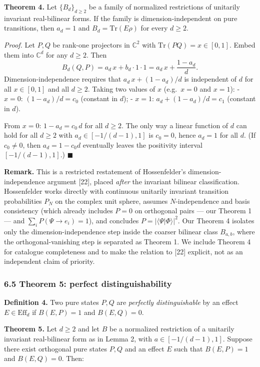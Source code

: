 \documentclass[
]{article}
\begin{document}
\textbf{Theorem 4.} Let \(\{B_d\}_{d\geq 2}\) be a family of normalized
restrictions of unitarily invariant real-bilinear forms. If the family
is dimension-independent on pure transitions, then \(a_d=1\) and
\(B_d=\mathrm{Tr}(E\rho)\) for every \(d\geq 2\).

\emph{Proof.} Let \(P,Q\) be rank-one projectors in \(\mathbb C^2\) with
\(\mathrm{Tr}(PQ)=x\in[0,1]\). Embed them into \(\mathbb C^d\) for any
\(d\geq 2\). Then
\[B_d(Q,P)=a_d\,x+b_d\cdot 1\cdot 1=a_d\,x+\frac{1-a_d}{d}.\]
Dimension-independence requires that \(a_d\,x+(1-a_d)/d\) is independent
of \(d\) for all \(x\in[0,1]\) and all \(d\geq 2\). Taking two values of
\(x\) (e.g.~\(x=0\) and \(x=1\)): - \(x=0\): \((1-a_d)/d = c_0\)
(constant in \(d\)); - \(x=1\): \(a_d+(1-a_d)/d = c_1\) (constant in
\(d\)).

From \(x=0\): \(1-a_d=c_0\,d\) for all \(d\geq 2\). The only way a
linear function of \(d\) can hold for all \(d\geq 2\) with
\(a_d\in[-1/(d-1),1]\) is \(c_0=0\), hence \(a_d=1\) for all \(d\). (If
\(c_0\neq 0\), then \(a_d=1-c_0 d\) eventually leaves the positivity
interval \([-1/(d-1),1]\).) \(\blacksquare\)

\textbf{Remark.} This is a restricted restatement of Hossenfelder's
dimension-independence argument {[}22{]}, placed \emph{after} the
invariant bilinear classification. Hossenfelder works directly with
continuous unitarily invariant transition probabilities \(P_N\) on the
complex unit sphere, assumes \(N\)-independence and basis consistency
(which already includes \(P=0\) on orthogonal pairs --- our Theorem 1
--- and \(\sum_i P(\Psi\to e_i)=1\)), and concludes
\(P=|\langle\Psi|\Phi\rangle|^2\). Our Theorem 4 isolates only the
dimension-independence step inside the coarser bilinear class
\(B_{a,b}\), where the orthogonal-vanishing step is separated as Theorem
1. We include Theorem 4 for catalogue completeness and to make the
relation to {[}22{]} explicit, not as an independent claim of priority.

\subsubsection{6.5 Theorem 5: perfect
distinguishability}\label{theorem-5-perfect-distinguishability}

\textbf{Definition 4.} Two pure states \(P,Q\) are \emph{perfectly
distinguishable} by an effect \(E\in\mathrm{Eff}_d\) if \(B(E,P)=1\) and
\(B(E,Q)=0\).

\textbf{Theorem 5.} Let \(d\geq 2\) and let \(B\) be a normalized
restriction of a unitarily invariant real-bilinear form as in Lemma 2,
with \(a\in[-1/(d-1),1]\). Suppose there exist orthogonal pure states
\(P,Q\) and an effect \(E\) such that \(B(E,P)=1\) and \(B(E,Q)=0\).
Then:
\end{document}

